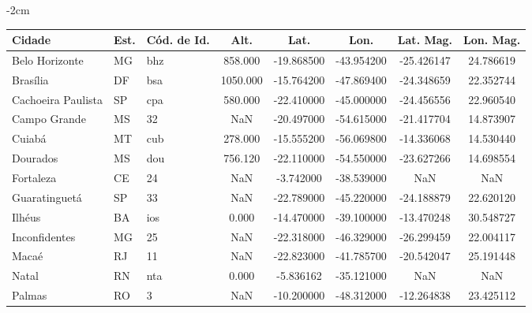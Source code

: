 \begin{table}
\addtolength{\leftskip} {-2cm} %
\addtolength{\rightskip}{-2cm}
\small
\begin{tabular}{|l|l|l|c|c|c|c|c|}
\hline
Cidade              & Est.  & Cód. de Id.           &  Alt.     &   Lat.     &  Lon.      &  Lat. Mag.    &  Lon. Mag.       \\ \hline
Belo Horizonte      &    MG &                   bhz &   858.000 & -19.868500 & -43.954200 &    -25.426147 &      24.786619   \\ \hline
Brasília            &    DF &                   bsa &  1050.000 & -15.764200 & -47.869400 &    -24.348659 &      22.352744   \\ \hline
Cachoeira Paulista  &    SP &                   cpa &   580.000 & -22.410000 & -45.000000 &    -24.456556 &      22.960540   \\ \hline
Campo Grande        &    MS &                    32 &       NaN & -20.497000 & -54.615000 &    -21.417704 &      14.873907   \\ \hline
Cuiabá              &    MT &                   cub &   278.000 & -15.555200 & -56.069800 &    -14.336068 &      14.530440   \\ \hline
Dourados            &    MS &                   dou &   756.120 & -22.110000 & -54.550000 &    -23.627266 &      14.698554   \\ \hline
Fortaleza           &    CE &                    24 &       NaN &  -3.742000 & -38.539000 &           NaN &            NaN   \\ \hline
Guaratinguetá       &    SP &                    33 &       NaN & -22.789000 & -45.220000 &    -24.188879 &      22.620120   \\ \hline
Ilhéus              &    BA &                   ios &     0.000 & -14.470000 & -39.100000 &    -13.470248 &      30.548727   \\ \hline
Inconfidentes       &    MG &                    25 &       NaN & -22.318000 & -46.329000 &    -26.299459 &      22.004117   \\ \hline
Macaé               &    RJ &                    11 &       NaN & -22.823000 & -41.785700 &    -20.542047 &      25.191448   \\ \hline
Natal               &    RN &                   nta &     0.000 &  -5.836162 & -35.121000 &           NaN &            NaN   \\ \hline
Palmas              &    RO &                     3 &       NaN & -10.200000 & -48.312000 &    -12.264838 &      23.425112   \\ \hline

\end{tabular}
\end{table}
